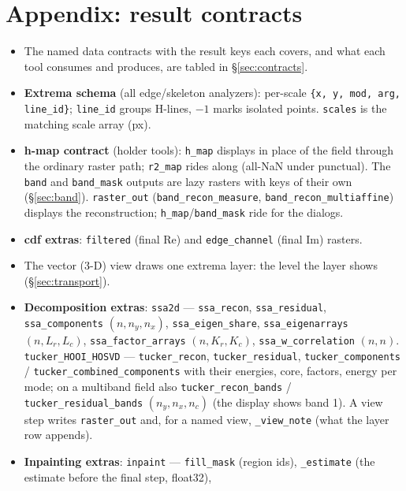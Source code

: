 \documentclass[10pt]{article}
\newcommand{\dev}[1]{\texttt{#1}}
\begin{document}
\section*{Appendix: result contracts}
\begin{itemize}\itemsep2pt
  \item The named data contracts with the result keys each covers, and what each tool
        consumes and produces, are tabled in \S\ref{sec:contracts}.
  \item \textbf{Extrema schema} (all edge/skeleton analyzers): per-scale
        \texttt{\{x, y, mod, arg, line\_id\}}; \texttt{line\_id} groups H-lines,
        $-1$ marks isolated points. \texttt{scales} is the matching scale array (px).
  \item \textbf{h-map contract} (holder tools): \texttt{h\_map} displays in place of the
        field through the ordinary raster path; \texttt{r2\_map} rides along
        (all-NaN under punctual). The \texttt{band} and \texttt{band\_mask} outputs are
        lazy rasters with keys of their own (\S\ref{sec:band}). \texttt{raster\_out}
        (\dev{band\_recon\_measure}, \dev{band\_recon\_multiaffine}) displays the
        reconstruction; \texttt{h\_map}/\texttt{band\_mask} ride for the dialogs.
  \item \textbf{cdf extras}: \texttt{filtered} (final Re) and \texttt{edge\_channel}
        (final Im) rasters.
  \item The vector (3-D) view draws one extrema layer: the level the layer shows
        (\S\ref{sec:transport}).
  \item \sloppy\textbf{Decomposition extras}: \dev{ssa2d} --- \texttt{ssa\_recon},
        \texttt{ssa\_residual}, \texttt{ssa\_components} $(n,n_y,n_x)$,
        \texttt{ssa\_eigen\_share}, \texttt{ssa\_eigenarrays} $(n,L_r,L_c)$,
        \texttt{ssa\_factor\_arrays} $(n,K_r,K_c)$, \texttt{ssa\_w\_correlation} $(n,n)$.
        \dev{tucker\_HOOI\_HOSVD} --- \texttt{tucker\_recon}, \texttt{tucker\_residual},
        \texttt{tucker\_components} / \texttt{tucker\_combined\_components} with their
        energies, core, factors, energy per mode; on a multiband field also
        \texttt{tucker\_recon\_bands} / \texttt{tucker\_residual\_bands} $(n_y,n_x,n_c)$ (the
        display shows band 1). A view step writes \texttt{raster\_out} and, for a named view,
        \texttt{\_view\_note} (what the layer row appends).
  \item \textbf{Inpainting extras}: \dev{inpaint} --- \texttt{fill\_mask} (region ids),
        \texttt{\_estimate} (the estimate before the final step, float32),

\end{itemize}
\end{document}
